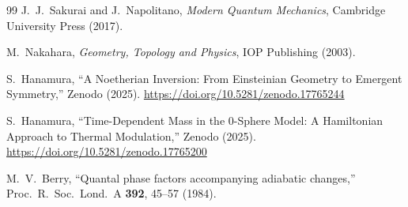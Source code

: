\documentclass[%
 reprint,
 amsmath,amssymb,
 aps,
 prb,
]{revtex4-2}
\numberwithin{equation}{section}
\begin{document}
\begin{thebibliography}{99}
J.~J.~Sakurai and J.~Napolitano,
\textit{Modern Quantum Mechanics},
Cambridge University Press (2017).

M.~Nakahara,
\textit{Geometry, Topology and Physics},
IOP Publishing (2003).

S.~Hanamura,
``A Noetherian Inversion: From Einsteinian Geometry to Emergent Symmetry,''
Zenodo (2025).
\href{https://doi.org/10.5281/zenodo.17765244}{https://doi.org/10.5281/zenodo.17765244}

S.~Hanamura,
``Time-Dependent Mass in the 0-Sphere Model: A Hamiltonian Approach to Thermal Modulation,''
Zenodo (2025).
\href{https://doi.org/10.5281/zenodo.17765200}{https://doi.org/10.5281/zenodo.17765200}

M.~V.~Berry,
``Quantal phase factors accompanying adiabatic changes,''
Proc.\ R.\ Soc.\ Lond.\ A {\bf 392}, 45--57 (1984).


\end{thebibliography}
\end{document}
